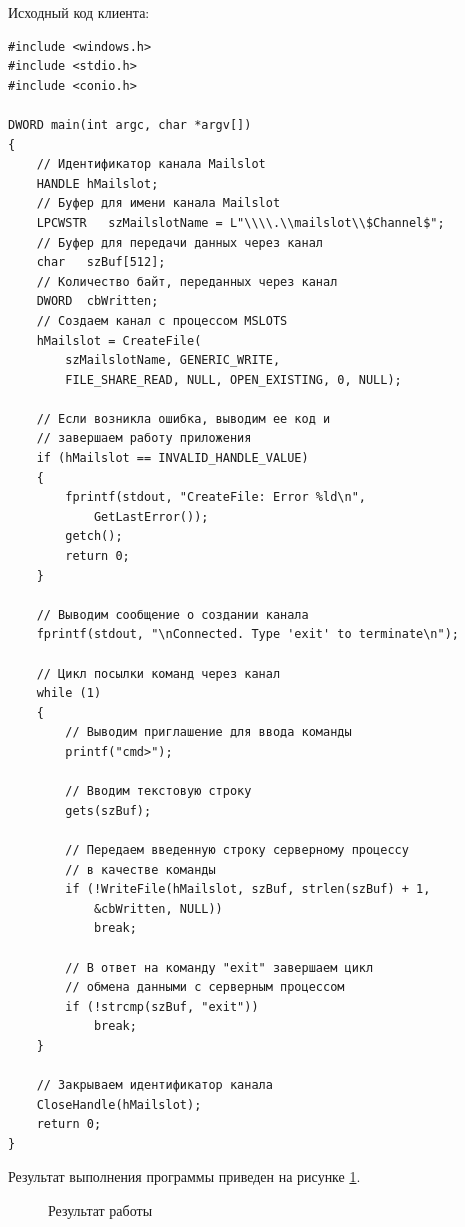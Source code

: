 \documentclass[a4paper]{article}
\begin{document}
	Исходный код клиента:
	\begin{lstlisting}[style=crs_cpp]
#include <windows.h>
#include <stdio.h>
#include <conio.h>

DWORD main(int argc, char *argv[])
{
	// Идентификатор канала Mailslot
	HANDLE hMailslot;
	// Буфер для имени канала Mailslot
	LPCWSTR   szMailslotName = L"\\\\.\\mailslot\\$Channel$";
	// Буфер для передачи данных через канал
	char   szBuf[512];
	// Количество байт, переданных через канал
	DWORD  cbWritten;
	// Создаем канал с процессом MSLOTS
	hMailslot = CreateFile(
		szMailslotName, GENERIC_WRITE,
		FILE_SHARE_READ, NULL, OPEN_EXISTING, 0, NULL);

	// Если возникла ошибка, выводим ее код и 
	// завершаем работу приложения
	if (hMailslot == INVALID_HANDLE_VALUE)
	{
		fprintf(stdout, "CreateFile: Error %ld\n",
			GetLastError());
		getch();
		return 0;
	}

	// Выводим сообщение о создании канала
	fprintf(stdout, "\nConnected. Type 'exit' to terminate\n");

	// Цикл посылки команд через канал
	while (1)
	{
		// Выводим приглашение для ввода команды
		printf("cmd>");

		// Вводим текстовую строку
		gets(szBuf);

		// Передаем введенную строку серверному процессу
		// в качестве команды
		if (!WriteFile(hMailslot, szBuf, strlen(szBuf) + 1,
			&cbWritten, NULL))
			break;

		// В ответ на команду "exit" завершаем цикл
		// обмена данными с серверным процессом
		if (!strcmp(szBuf, "exit"))
			break;
	}

	// Закрываем идентификатор канала
	CloseHandle(hMailslot);
	return 0;
}
	\end{lstlisting}
	
	Результат выполнения программы приведен на рисунке \ref{img:task9}.
	\begin{figure}[h!]
		\caption{Результат работы}
		\label{img:task9}
	\end{figure}
	
\end{document}

